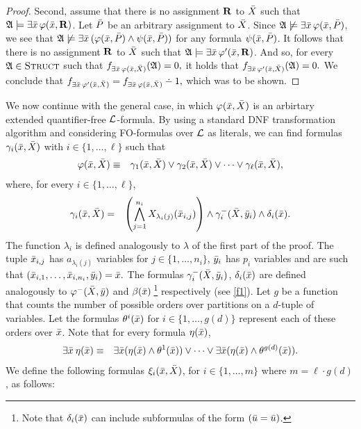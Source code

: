 \begin{enumerate}
\begin{proof}
		Second, assume that there is no assignment $\R$ to $\X$ such that $\A\models\exists\x\,\varphi(\x,\R)$. Let $\P$ be an arbitrary assignment to $\X$. Since $\A\not\models\exists\x\,\varphi(\x,\P)$, we see that $\A\not\models\exists\x\,(\varphi(\x,\P)\wedge\psi(\x,\P))$ for any formula $\psi(\x,\P)$. It follows that there is no assignment $\R$ to $\X$ such that $\A\models\exists\x\,\varphi^\prime(\x,\R)$. And so, for every $\A\in\str$ such that $f_{\exists\x\,\varphi(\x,\X)}(\A)=0,$ it holds that $f_{\exists\x\,\varphi^\prime(\x,\X)}(\A) = 0.$ We conclude that $f_{\exists\x\,\varphi^\prime(\x,\X)} = f_{\exists\x\,\varphi(\x,\X)}\dotminus 1,$ which was to be shown.
	\end{proof}
	We now continue with the general case, in which $\varphi(\x,\X)$ is an arbirtary extended quantifier-free $\L$-formula. By using a standard DNF transformation algorithm and considering FO-formulas over $\L$ as literals, we can find formulas $\gamma_i(\x,\X)$ with $i\in\{1,\ldots,\ell\}$ such that
	\begin{eqnarray*}
		\varphi(\x,\X) &\equiv& \gamma_1(\x,\X) \vee \gamma_2(\x,\X) \vee \dots  \vee \gamma_{\ell}(\x,\X),
	\end{eqnarray*}
	where, for every $i\in\{1,\ldots,\ell\}$, 
	\begin{eqnarray*}
		\gamma_i(\x,\X) &=& \left( \bigwedge_{j=1}^{n_i} X_{\lambda_i(j)}(\x_{i,j}) \right) \wedge \gamma^{-}_i(\X,\y_i)  \wedge \delta_i(\x).
	\end{eqnarray*}
	The function $\lambda_i$ is defined analogously to $\lambda$ of the first part of the proof. The tuple $\x_{i,j}$ has $a_{\lambda_i(j)}$ variables for $j\in\{1,\ldots,n_i\}$, $\y_i$ has $p_i$ variables and are such that $(\x_{i,1},\ldots,\x_{i,n_i},\y_i) = \x.$ The formulas $\gamma^{-}_i(\X,\y_i)$, $\delta_i(\x)$ are defined analogously to $\varphi^{-}(\X,\y)$ and $\beta(\x)\,$\footnote[2]{Note that $\delta_i(\x)$ can include subformulas of the form $(\u = \u)$.} respectively (see \eqref{f1}). Let $g$ be a function that counts the number of possible orders over partitions on a $d$-tuple of variables. Let the formulas $\theta^i(\x)$ for $i\in\{1,\ldots,g(d)\}$ represent each of these orders over $\x$. Note that for every formula $\eta(\x)$,
	\begin{eqnarray*}
		\exists\x\:\eta(\x) &\equiv& \exists\x(\eta(\x)\wedge\theta^1(\x)) \vee \cdots \vee \exists\x(\eta(\x)\wedge\theta^{g(d)}(\x)).
	\end{eqnarray*}
	We define the following formulas $\xi_i(\x,\X)$, for $i\in\{1,\ldots,m\}$ where $m = \ell \cdot g(d)$, as follows: 

\end{enumerate}
